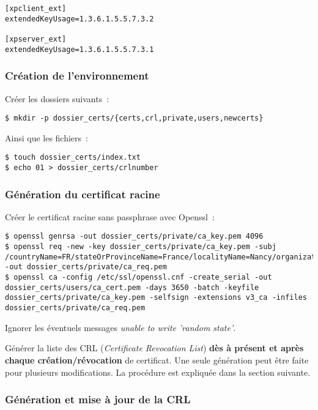 \begin{lstlisting}
[xpclient_ext]
extendedKeyUsage=1.3.6.1.5.5.7.3.2

[xpserver_ext]
extendedKeyUsage=1.3.6.1.5.5.7.3.1
\end{lstlisting}

\subsubsection{Création de l'environnement}

Créer les dossiers suivants~:

\begin{lstlisting}
$ mkdir -p dossier_certs/{certs,crl,private,users,newcerts}
\end{lstlisting}

Ainsi que les fichiers~:

\begin{lstlisting}
$ touch dossier_certs/index.txt
$ echo 01 > dossier_certs/crlnumber
\end{lstlisting}

\subsubsection{Génération du certificat racine}

Créer le certificat racine sans passphrase avec Openssl~:

\begin{lstlisting}
$ openssl genrsa -out dossier_certs/private/ca_key.pem 4096 
$ openssl req -new -key dossier_certs/private/ca_key.pem -subj /countryName=FR/stateOrProvinceName=France/localityName=Nancy/organizationName=BHConsulting/commonName=nom_entreprise/ -out dossier_certs/private/ca_req.pem
$ openssl ca -config /etc/ssl/openssl.cnf -create_serial -out dossier_certs/users/ca_cert.pem -days 3650 -batch -keyfile dossier_certs/private/ca_key.pem -selfsign -extensions v3_ca -infiles dossier_certs/private/ca_req.pem
\end{lstlisting}

Ignorer les éventuels messages \og{}\emph{unable to write 'random state'}\fg.

Générer la liste des CRL (\emph{Certificate Revocation List}) \textbf{dès à présent et après chaque création/révocation} de certificat. Une seule génération peut être faite pour plusieurs modifications. La procédure est expliquée dans la section suivante.

\subsubsection{Génération et mise à jour de la CRL}
\label{gen-crl}

